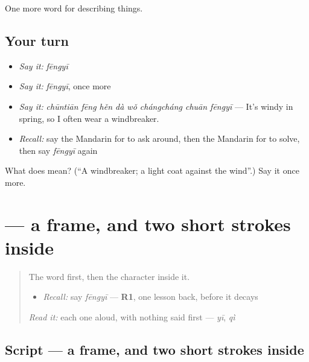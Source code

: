 \begin{grammarlens}[title={What you've built}]
One more word for describing things.
\end{grammarlens}

\subsection*{Your turn}
\begin{itemize}
\raggedright
  \item \emph{Say it:} \emph{fēngyī}
  \item \emph{Say it:} \emph{fēngyī}, once more
  \item \emph{Say it:} \emph{chūntiān fēng hěn dà wǒ chángcháng chuān fēngyī} — It's windy in spring, so I often wear a windbreaker.
  \item \emph{Recall:} say the Mandarin for to ask around, then the Mandarin for to solve, then say \emph{fēngyī} again
\end{itemize}

\begin{tcolorbox}[breakable,colback=teal!4,colframe=teal!35!black,title={Before you move on}]
What does  mean? (\textquotedblleft{}A windbreaker; a light coat against the wind\textquotedblright{}.) Say it once more.
\end{tcolorbox}
\section[\texorpdfstring{\zh{风} (fēng)}{风 (fēng)}]{ — a frame, and two short strokes inside}

\label{lesson:ZH-W218-feng-wind}



\begin{quote}
The word first, then the character inside it.

\begin{itemize}
\raggedright
  \item \emph{Recall:} say \emph{fēngyī} — \textbf{R1}, one lesson back, before it decays
\end{itemize}

\begin{quote}
 
\end{quote}

\emph{Read it:} each one aloud, with nothing said first — \emph{yī}, \emph{qì}
\end{quote}

\subsection*{Script — a frame, and two short strokes inside}

